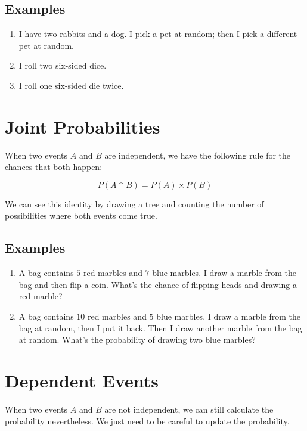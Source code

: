 \documentclass[letterpaper,10pt]{article}
\begin{document}
\subsection{Examples}

\begin{enumerate}
 \item I have two rabbits and a dog. I pick a pet at random; then I pick a different pet at random.
 \item I roll two six-sided dice.
 \item I roll one six-sided die twice.
\end{enumerate}

\section{Joint Probabilities}

When two events $A$ and $B$ are independent, we have the following rule for the chances that both happen:

\begin{equation}
 P(A \cap B) = P(A) \times P(B)
\end{equation}

We can see this identity by drawing a tree and counting the number of possibilities where both events come
true.

\subsection{Examples}

\begin{enumerate}
 \item A bag contains $5$ red marbles and $7$ blue marbles. I draw a marble from the bag and then
 flip a coin. What's the chance of flipping heads and drawing a red marble?
 \item A bag contains $10$ red marbles and $5$ blue marbles. I draw a marble from the bag at random, then I put
 it back. Then I draw another marble from the bag at random. What's the probability of drawing two blue marbles?
\end{enumerate}

\section{Dependent Events}

When two events $A$ and $B$ are not independent, we can still calculate the probability nevertheless. We just
need to be careful to update the probability.
\end{document}
